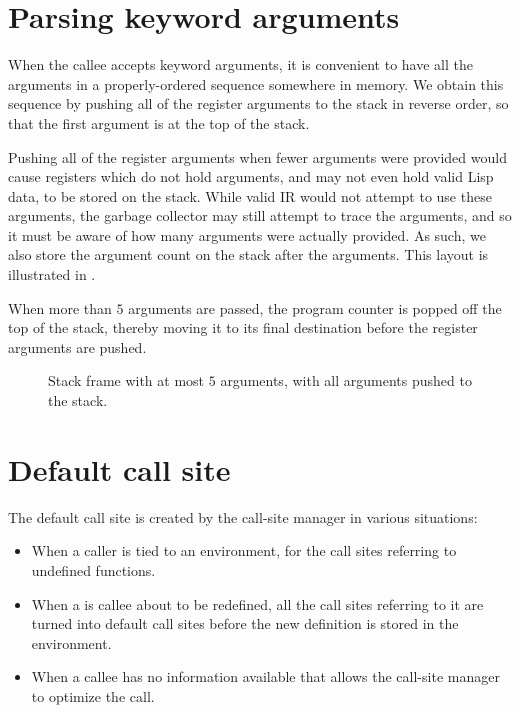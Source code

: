 \section{Parsing keyword arguments}

When the callee accepts keyword arguments, it is convenient to have
all the arguments in a properly-ordered sequence somewhere in memory.
We obtain this sequence by pushing all of the register arguments to
the stack in reverse order, so that the first argument is at the top
of the stack.

Pushing all of the register arguments when fewer arguments were
provided would cause registers which do not hold arguments, and may
not even hold valid Lisp data, to be stored on the stack.  While valid
IR would not attempt to use these arguments, the garbage collector may
still attempt to trace the arguments, and so it must be aware of how
many arguments were actually provided. As such, we also store the
argument count on the stack after the arguments.  This layout is
illustrated in .

When more than $5$ arguments are passed, the program counter
is popped off the top of the stack, thereby moving it to its final
destination before the register arguments are pushed.


\begin{figure}
\begin{center}
\end{center}
\caption{\label{fig-x86-64-stack-frame-with-pushed-arguments}
  Stack frame with at most $5$ arguments, with all arguments pushed
  to the stack.}
\end{figure}

\section{Default call site}

The default call site is created by the call-site manager in various
situations:

\begin{itemize}
\item When a caller is tied to an environment, for the call sites
  referring to undefined functions.
\item When a is callee about to be redefined, all the call sites
  referring to it are turned into default call sites before the new
  definition is stored in the environment.
\item When a callee has no information available that allows the
  call-site manager to optimize the call.
\end{itemize}

